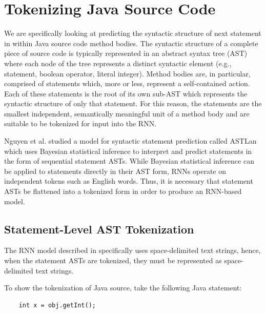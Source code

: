 \documentclass[runningheads,a4paper]{llncs}
\begin{document}


\section{Tokenizing Java Source Code}

We are specifically looking at predicting the syntactic structure  of next 
statement in within Java source code method bodies. The syntactic structure 
of a complete piece of source code is typically represented in an abstract 
syntax tree (AST) where each node of the tree represents a distinct 
syntactic element (e.g., statement, boolean operator, literal integer). 
Method bodies are, in particular, comprised of statements which, more or 
less, represent a self-contained action. Each of these statements is the 
root of its own sub-AST which represents the syntactic structure of only 
that statement. For this reason, the statements are the smallest 
independent, semantically meaningful unit of a method body and are suitable 
to be tokenized for input into the RNN.

Nguyen et al. \cite{Nguyen} studied a model for syntactic statement prediction 
called ASTLan which uses Bayesian statistical inference to interpret and 
predict statements in the form of sequential statement ASTs. While Bayesian 
statistical inference can be applied to statements directly in their AST 
form, RNNs operate on independent tokens such as English words. Thus, it is 
necessary that statement ASTs be flattened into a tokenized form in order to 
produce an RNN-based model.

\subsection{Statement-Level AST Tokenization}

The RNN model described in \citet{LSTMArticle} specifically uses space-delimited 
text strings, hence, when the statement ASTs are tokenized, they 
must be represented as space-delimited text strings.

To show the tokenization of Java source, take the following Java statement:

\begin{verbatim}
    int x = obj.getInt();
\end{verbatim}
\end{document}
